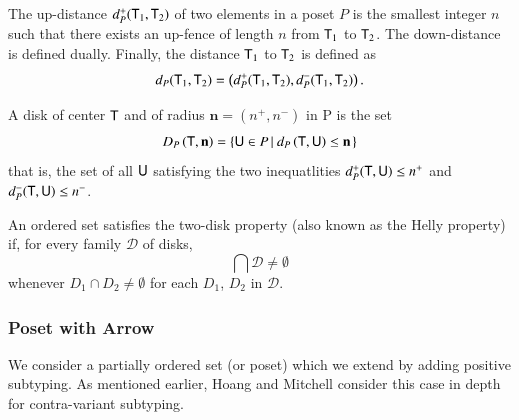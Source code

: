 \documentclass{report}
\begin{document}
  \begin{dfn}
    The up-distance $d_P^+(\textsf{T}_1,\textsf{T}_2)$ of two elements in a poset $P$ is the smallest
    integer $n$ such that there exists an up-fence of length $n$ from $\textsf{T}_1$ to $\textsf{T}_2$.
    The down-distance is defined dually. Finally, the distance $\textsf{T}_1$ to $\textsf{T}_2$
    is defined as
    \begin{displaymath}
      d_P(\textsf{T}_1,\textsf{T}_2)=\left({d_P^+(\textsf{T}_1,\textsf{T}_2), d_P^-(\textsf{T}_1,\textsf{T}_2)}\right)\textrm{.}
    \end{displaymath}
  \end{dfn}
  \begin{dfn}
    A disk of center $\textsf{T}$ and of radius $\mathbf{n}=(n^+,n^-)$ in P is the set
    \begin{displaymath}
      D_P\left({\textsf{T}, \mathbf{n}}\right) = \left\{{\textsf{U}\in P}\left|\ {d_P\left({\textsf{T},\textsf{U}}\right)\le\mathbf{n}}\right.\right\}
    \end{displaymath}
    that is, the set of all $\textsf{U}$ satisfying the two inequatlities
    $d_P^+(\textsf{T},\textsf{U})\le n^+$ and $d_P^-(\textsf{T},\textsf{U})\le n^-$.
  \end{dfn}
  \begin{dfn}
    An ordered set satisfies the two-disk property (also known as the Helly property)
    if, for every family $\mathcal{D}$ of disks,
    \begin{displaymath}
      \bigcap\mathcal{D}\neq\emptyset
    \end{displaymath}
    whenever $D_1\cap D_2\neq\emptyset$ for each $D_1$, $D_2$ in $\mathcal{D}$.
  \end{dfn}
  
  \subsubsection{Poset with Arrow}
  We consider a partially ordered set (or poset) which we extend by adding positive
  subtyping. As mentioned earlier, Hoang and Mitchell \cite{hoang:lower-bounds}
  consider this case in depth for contra-variant subtyping.
  
\end{document}
